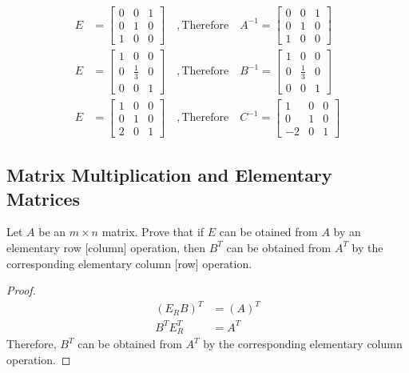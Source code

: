 \documentclass[10pt, oneside]{article}
\begin{document}
\[
	\begin{split}
		E &= \begin{bmatrix} 0 & 0 & 1 \\ 0 & 1 & 0 \\ 1 & 0 & 0 \end{bmatrix} \quad , \text{Therefore} \quad A^{-1} = \begin{bmatrix} 0 & 0 & 1 \\ 0 & 1 & 0 \\ 1 & 0 & 0 \end{bmatrix} \\
		E &= \begin{bmatrix} 1 & 0 & 0 \\ 0 & \frac{1}{3} & 0 \\ 0 & 0 & 1 \end{bmatrix} \quad , \text{Therefore} \quad B^{-1} = \begin{bmatrix} 1 & 0 & 0 \\ 0 & \frac{1}{3} & 0 \\ 0 & 0 & 1 \end{bmatrix} \\
		E &= \begin{bmatrix} 1 & 0 & 0 \\ 0 & 1 & 0 \\ 2 & 0 & 1 \end{bmatrix} \quad , \text{Therefore} \quad C^{-1} = \begin{bmatrix} 1 & 0 & 0 \\ 0 & 1 & 0 \\ -2 & 0 & 1 \end{bmatrix}
	\end{split}
\]

\subsection{Matrix Multiplication and Elementary Matrices}

Let $A$ be an $m \times n$ matrix. Prove that if $E$ can be otained from $A$ by an elementary row [column] operation, then $B^T$ can be obtained from $A^T$ by the corresponding elementary column [row] operation.

\begin{proof}
	\begin{align*}
		(E_RB)^T & = (A)^T \\
		B^TE_R^T & = A^T
	\end{align*}
	Therefore, $B^T$ can be obtained from $A^T$ by the corresponding elementary column operation.
\end{proof}
\end{document}
